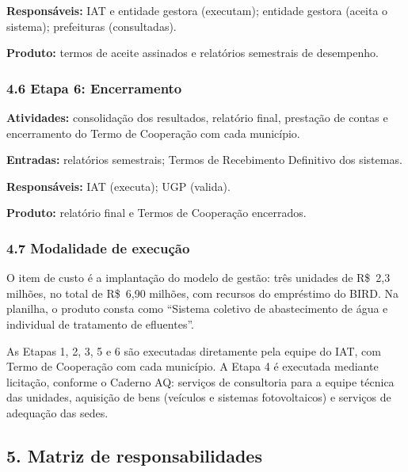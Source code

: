 \textbf{Responsáveis:} IAT e entidade gestora (executam); entidade gestora (aceita o sistema); prefeituras (consultadas).

\textbf{Produto:} termos de aceite assinados e relatórios semestrais de desempenho.

\subsubsection*{4.6 Etapa 6: Encerramento}

\textbf{Atividades:} consolidação dos resultados, relatório final, prestação de contas e encerramento do Termo de Cooperação com cada município.

\textbf{Entradas:} relatórios semestrais; Termos de Recebimento Definitivo dos sistemas.

\textbf{Responsáveis:} IAT (executa); UGP (valida).

\textbf{Produto:} relatório final e Termos de Cooperação encerrados.

\subsubsection*{4.7 Modalidade de execução}

O item de custo é a implantação do modelo de gestão: três unidades de R\$~2,3 milhões, no total de R\$~6,90 milhões, com recursos do empréstimo do BIRD. Na planilha, o produto consta como “Sistema coletivo de abastecimento de água e individual de tratamento de efluentes”.

As Etapas 1, 2, 3, 5 e 6 são executadas diretamente pela equipe do IAT, com Termo de Cooperação com cada município. A Etapa 4 é executada mediante licitação, conforme o Caderno AQ: serviços de consultoria para a equipe técnica das unidades, aquisição de bens (veículos e sistemas fotovoltaicos) e serviços de adequação das sedes.



{}
\subsection*{5. Matriz de responsabilidades}

